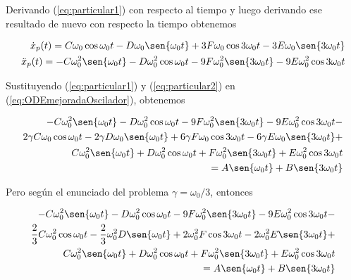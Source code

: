 \documentclass[a4paper,10pt]{article}
\numberwithin{equation}{section}
\begin{document}
Derivando (\ref{eq:particular1}) con respecto al tiempo y luego derivando ese resultado de nuevo
con respecto la tiempo obtenemos

\begin{align}
 \begin{split}
  \dot{x}_p (t) = C \omega_0 \cos{\omega_0t} - D\omega_0 \sen{\omega_0t} + 
  3F\omega_0 \cos{3 \omega_0t} - 3E\omega_0 \sen{3 \omega_0t} \\
  \ddot{x}_p (t) = - C\omega_0^2 \sen{\omega_0t} - D\omega_0^2 \cos{\omega_0t} - 
  9F\omega_0^2 \sen{3 \omega_0t} - 9E\omega_0^2 \cos{3 \omega_0t} 
  \label{eq:particular2}
 \end{split}
\end{align}

Sustituyendo (\ref{eq:particular1}) y (\ref{eq:particular2}) en (\ref{eq:ODEmejoradaOscilador}),
obtenemos

\begin{align*}
%
 - C\omega_0^2 \sen{\omega_0t} - D\omega_0^2 \cos{\omega_0t} - 
  9F\omega_0^2 \sen{3 \omega_0t} - 9E\omega_0^2 \cos{3 \omega_0t} - \\
  2\gamma C \omega_0 \cos{\omega_0t} - 2\gamma D\omega_0 \sen{\omega_0t} + 
  6\gamma F\omega_0 \cos{3 \omega_0t} - 6\gamma E\omega_0 \sen{3 \omega_0t} + \\
  C\omega_0^2 \sen{\omega_0t} + D\omega_0^2 \cos{\omega_0t} + F\omega_0^2 
  \sen{3 \omega_0t} + E\omega_0^2 \cos{3 \omega_0t} \\
  = A \sen{\omega_0t} + B \sen{3\omega_0t}
\end{align*}

Pero según el enunciado del problema $\gamma = \omega_0/3$, entonces

\begin{align}
 \begin{split}
- C\omega_0^2 \sen{\omega_0t} - D\omega_0^2 \cos{\omega_0t} - 
  9F\omega_0^2 \sen{3 \omega_0t} - 9E\omega_0^2 \cos{3 \omega_0t} - \\
  \frac{2}{3} C \omega_0^2 \cos{\omega_0t} - \frac{2}{3} \omega_0^2 D \sen{\omega_0t} + 
  2 \omega_0^2 F \cos{3 \omega_0t} - 2 \omega_0^2 E \sen{3 \omega_0t} + \\
  C\omega_0^2 \sen{\omega_0t} + D\omega_0^2 \cos{\omega_0t} + F\omega_0^2 
  \sen{3 \omega_0t} + E\omega_0^2 \cos{3 \omega_0t} \\
  = A \sen{\omega_0t} + B \sen{3\omega_0t}
  \end{split}
\end{align}
\end{document}
